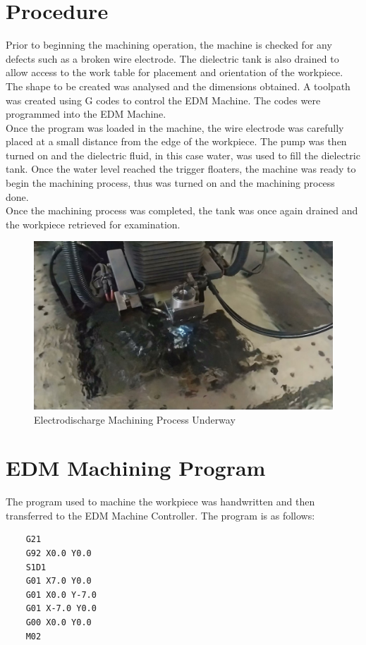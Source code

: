 \section{Procedure}
Prior to beginning the machining operation, the machine is checked for any defects such as a broken wire electrode. The dielectric tank is also drained to allow access to the work table for placement and orientation of the workpiece.\\
The shape to be created was analysed and the dimensions obtained. A toolpath was created using G codes to control the EDM Machine. The codes were programmed into the EDM Machine.\\
Once the program was loaded in the machine, the wire electrode was carefully placed at a small distance from the edge of the workpiece. The pump was then turned on and the dielectric fluid, in this case water, was used to fill the dielectric tank. Once the water level reached the trigger floaters, the machine was ready to begin the machining process, thus was turned on and the machining process done.\\
Once the machining process was completed, the tank was once again drained and the workpiece retrieved for examination.
\begin{figure}[h!]
	\centering
	\includegraphics[width=0.7\linewidth]{Figures/edmmachining}
	\caption[EDM Machining Process]{Electrodischarge Machining Process Underway}
	\label{fig:cutting}
\end{figure}
\section{EDM Machining Program}
The program used to machine the workpiece was  handwritten and then transferred to the EDM Machine Controller. The program is as follows:
\begin{verbatim}
	G21
	G92 X0.0 Y0.0
	S1D1
	G01 X7.0 Y0.0
	G01 X0.0 Y-7.0
	G01 X-7.0 Y0.0
	G00 X0.0 Y0.0
	M02
\end{verbatim}